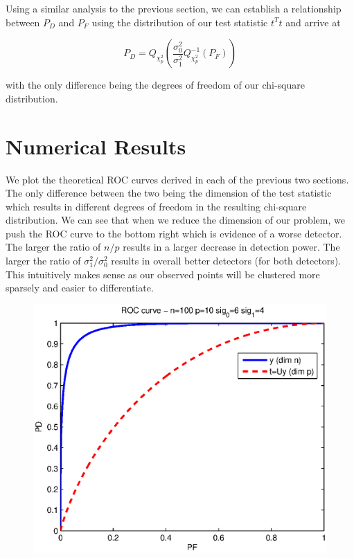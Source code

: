\documentclass[english]{article}
\begin{document}
Using a similar analysis to the previous section, we can establish a relationship between $P_D$ and $P_F$ using the distribution of our test statistic $t^Tt$ and arrive at

\begin{equation}
P_D=Q_{\chi_p^2}\left(\frac{\sigma_0^2}{\sigma_1^2}Q^{-1}_{\chi_p^2}\left(P_F\right)\right)
\end{equation}

with the only difference being the degrees of freedom of our chi-square distribution.

\section*{Numerical Results}

We plot the theoretical ROC curves derived in each of the previous two sections. The only difference between the two being the dimension of the test statistic which results in different degrees of freedom in the resulting chi-square distribution. We can see that when we reduce the dimension of our problem, we push the ROC curve to the bottom right which is evidence of a worse detector. The larger the ratio of $n/p$ results in a larger decrease in detection power. The larger the ratio of $\sigma_1^2/\sigma_0^2$ results in overall better detectors (for both detectors). This intuitively makes sense as our observed points will be clustered more sparsely and easier to differentiate.

\begin{figure}
\centering
\includegraphics[width=5in]{roc_curve}
\end{figure}
\end{document}
